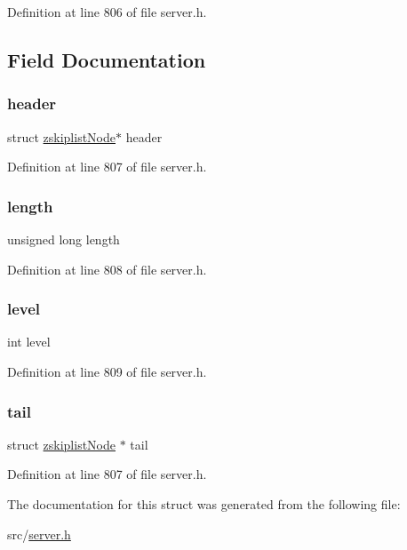Definition at line 806 of file server.\+h.



\subsection{Field Documentation}
\mbox{\label{structzskiplist_ade3018e820093435bd6592a7e5667dd4}} 
\subsubsection{\texorpdfstring{header}{header}}
{\footnotesize\ttfamily struct \hyperlink{structzskiplist_node}{zskiplist\+Node}$\ast$ header}



Definition at line 807 of file server.\+h.

\mbox{\label{structzskiplist_a9ee64c7b918513891b3834b93ad0e501}} 
\subsubsection{\texorpdfstring{length}{length}}
{\footnotesize\ttfamily unsigned long length}



Definition at line 808 of file server.\+h.

\mbox{\label{structzskiplist_acf4d33ee4cff36f69b924471174dcb11}} 
\subsubsection{\texorpdfstring{level}{level}}
{\footnotesize\ttfamily int level}



Definition at line 809 of file server.\+h.

\mbox{\label{structzskiplist_a8901eab71c29a7f378e629e720871a13}} 
\subsubsection{\texorpdfstring{tail}{tail}}
{\footnotesize\ttfamily struct \hyperlink{structzskiplist_node}{zskiplist\+Node} $\ast$ tail}



Definition at line 807 of file server.\+h.



The documentation for this struct was generated from the following file\+:\begin{DoxyCompactItemize}
\item 
src/\hyperlink{server_8h}{server.\+h}\end{DoxyCompactItemize}
